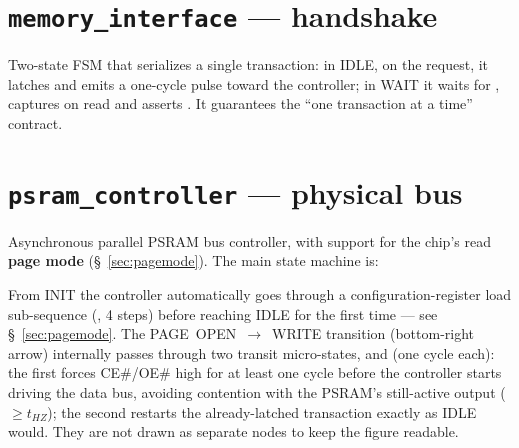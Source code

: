 \section{\texttt{memory\_interface} --- handshake}
Two-state FSM that serializes a single transaction: in IDLE, on the  request,
it latches  and emits a one-cycle  pulse
toward the controller; in WAIT it waits for , captures  on
read and asserts . It guarantees the ``one transaction at a time'' contract.

\section{\texttt{psram\_controller} --- physical bus}
Asynchronous parallel PSRAM bus controller, with support for the chip's read
\textbf{page mode} (\S~\ref{sec:pagemode}). The main state machine is:

\begin{center}
\end{center}

From INIT the controller automatically goes through a configuration-register load
sub-sequence (, 4 steps) before reaching IDLE for the first
time --- see \S~\ref{sec:pagemode}. The PAGE~OPEN~$\to$~WRITE transition
(bottom-right arrow) internally passes through two transit micro-states,
 and  (one cycle each): the
first forces CE\#/OE\# high for at least one cycle before the controller starts
driving the data bus, avoiding contention with the PSRAM's still-active output
($\geq t_{HZ}$); the second restarts the already-latched transaction exactly as
IDLE would. They are not drawn as separate nodes to keep the figure readable.

